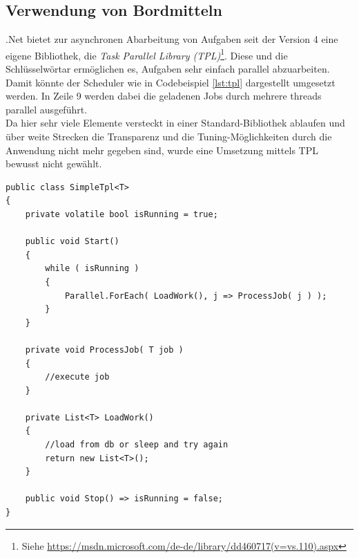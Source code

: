 \subsection{Verwendung von Bordmitteln}
.Net bietet zur asynchronen Abarbeitung von Aufgaben seit der Version 4 eine eigene Bibliothek, die \emph{Task Parallel Library (TPL)}\footnote{Siehe \url{https://msdn.microsoft.com/de-de/library/dd460717(v=vs.110).aspx}}. Diese und die Schlüsselwörtar  ermöglichen es, Aufgaben sehr einfach parallel abzuarbeiten. Damit könnte der Scheduler wie in Codebeispiel \ref{lst:tpl} dargestellt umgesetzt werden. In Zeile 9 werden dabei die geladenen Jobs durch mehrere threads parallel  ausgeführt.
\\Da hier sehr viele Elemente versteckt in einer Standard-Bibliothek ablaufen und über weite Strecken die Transparenz und die Tuning-Möglichkeiten durch die Anwendung nicht mehr gegeben sind, wurde eine Umsetzung mittels TPL bewusst nicht gewählt.

\begin{lstlisting}[caption={JobScheduler, einfache TPL Implementierung, siehe SimpleTpl.cs}, label={lst:tpl}, captionpos=b]
public class SimpleTpl<T>
{
	private volatile bool isRunning = true;
	
	public void Start()
	{
		while ( isRunning )
		{
			Parallel.ForEach( LoadWork(), j => ProcessJob( j ) );
		}
	}
	
	private void ProcessJob( T job )
	{
		//execute job
	}
	
	private List<T> LoadWork()
	{
		//load from db or sleep and try again
		return new List<T>();
	}
	
	public void Stop() => isRunning = false;
}
\end{lstlisting}
\chapterend
